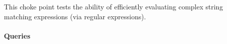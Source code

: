
This choke point tests the ability of efficiently evaluating complex string
matching expressions (\eg via regular expressions).


\paragraph{Queries}
{\raggedright

}